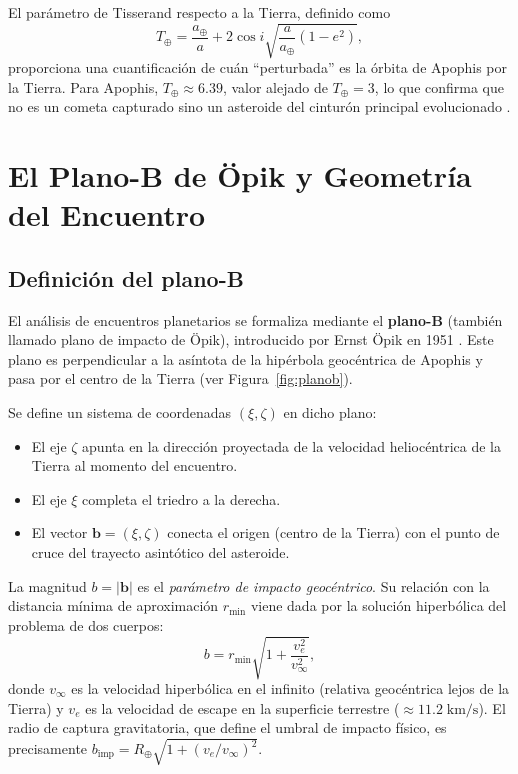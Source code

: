 \documentclass[a4paper]{article}
\begin{document}
El parámetro de Tisserand respecto a la Tierra, definido como
\begin{equation}
  T_\oplus = \frac{a_\oplus}{a} + 2\cos i\sqrt{\frac{a}{a_\oplus}\left(1-e^2\right)},
\end{equation}
proporciona una cuantificación de cuán ``perturbada'' es la órbita de Apophis por la Tierra. Para Apophis, $T_\oplus \approx 6.39$, valor alejado de $T_\oplus = 3$, lo que confirma que no es un cometa capturado sino un asteroide del cinturón principal evolucionado \cite{murray1999solar}.

\section{El Plano-B de Öpik y Geometría del Encuentro}

\subsection{Definición del plano-B}

El análisis de encuentros planetarios se formaliza mediante el \textbf{plano-B} (también llamado plano de impacto de Öpik), introducido por Ernst Öpik en 1951 \cite{opik1951encounter}. Este plano es perpendicular a la asíntota de la hipérbola geocéntrica de Apophis y pasa por el centro de la Tierra (ver Figura~\ref{fig:planob}).

Se define un sistema de coordenadas $(\xi, \zeta)$ en dicho plano:
\begin{itemize}
  \item El eje $\zeta$ apunta en la dirección proyectada de la velocidad heliocéntrica de la Tierra al momento del encuentro.
  \item El eje $\xi$ completa el triedro a la derecha.
  \item El vector $\mathbf{b} = (\xi, \zeta)$ conecta el origen (centro de la Tierra) con el punto de cruce del trayecto asintótico del asteroide.
\end{itemize}

La magnitud $b = |\mathbf{b}|$ es el \textit{parámetro de impacto geocéntrico}. Su relación con la distancia mínima de aproximación $r_\text{min}$ viene dada por la solución hiperbólica del problema de dos cuerpos:
\begin{equation}
  b = r_\text{min}\sqrt{1 + \frac{v_e^2}{v_\infty^2}},
  \label{eq:b}
\end{equation}
donde $v_\infty$ es la velocidad hiperbólica en el infinito (relativa geocéntrica lejos de la Tierra) y $v_e$ es la velocidad de escape en la superficie terrestre ($\approx 11.2\;\text{km/s}$). El radio de captura gravitatoria, que define el umbral de impacto físico, es precisamente $b_\text{imp} = R_\oplus\sqrt{1 + (v_e/v_\infty)^2}$.
\end{document}
